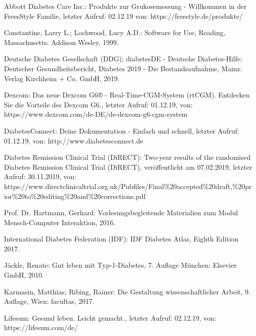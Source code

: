 \documentclass[a4paper,11pt]{article}%
\renewcommand{\\}{\vspace*{0.5\baselineskip} \newline}
\begin{document}
	\begin{thebibliography}{1}
		
		Abbott Diabetes Care Inc.:
		Produkte zur Grukosemessung - Willkommen in der FreesStyle Familie, letzter Aufruf: 02.12.19 von:
		https://freestyle.de/produkte/	
		
		Constantine, Larry L.; Lochwood, Lucy A.D.: 
		Software for Use, 
		Reading, Massachusetts: Addison Wesley,
		1999.
		
		Deutsche Diabetes Gesellschaft (DDG); diabetesDE - Deutsche Diabetes-Hilfe:
		Deutscher Gesundheitsbericht, Diabetes 2019 - Die Bestandsaufnahme, 
		Mainz: Verlag Kirchheim + Co. GmbH,
		2019.
		
		Dexcom:
		Das neue Dexcom G6® - Real-Time-CGM-System (rtCGM). Entdecken Sie die Vorteile des Dexcom G6., letzter Aufruf: 01.12.19, von: https://www.dexcom.com/de-DE/de-dexcom-g6-cgm-system
		
		DiabetesConnect:
		Deine Dokumentation - Einfach und schnell, letzter Aufruf: 01.12.19, von: http://www.diabetesconnect.de
		
		Diabetes Remission Clinical Trial (DiRECT):
		Two-year results of the randomised Diabetes Remission Clinical Trial (DiRECT), veröffentlicht am 07.02.2019, \newline
		letzter Aufruf: 30.11.2019, von: https://www.directclinicaltrial.org.uk/Pubfiles/Final\newline\%20accepted\%20draft,\%20prior\%20to\%20editing\%20and\%20corrections.pdf
		
		Prof. Dr. Hartmann, Gerhard: 
		Vorlesungsbegleitende Materialien zum Modul Mensch-Computer Interaktion, 
		2016.
		
		International Diabetes Federation (IDF): 
		IDF Diabetes Atlas, Eighth Edition 2017.
		
		Jäckle, Renate: 
		Gut leben mit Typ-1-Diabetes, 7. Auflage
		München: Elsevier GmbH,
		2010.
		
		Karmasin, Matthias; Ribing, Rainer: 
		Die Gestaltung wissenschaftlicher Arbeit, 9. Auflage,
		Wien: facultas,
		2017.
		
		Lifesum: Gesund leben. Leicht gemacht., letzter Aufruf: 02.12.19, von: \newline https://lifesum.com/de/
		

\end{thebibliography}
\end{document}
